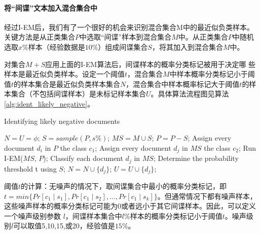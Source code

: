 \paragraph{将“间谍”文本加入混合集合中}

经过I-EM后，我们有了一个很好的机会来识别混合集合M中的最近似负类样本。关键方法是从正类集合$P$中选取“间谍”样本到混合集合$M$中。从正类集合$P$中随机选取$x\%$样本（经验数据是$10\%$）组成间谍集合$S$，将其加入到混合集合$M$中。

对集合$M + S$应用上面的I-EM算法后，间谍样本的概率分类标记被用于决定哪 些样本是最近似负类样本。设定一个阈值$t$，混合集合$M$中样本概率分类标记小于阈值$t$的样本集合是最近似负类样本集合$N$，混合集合中样本概率标记大于阈值$t$的样本集合（不包括间谍样本）是未标记样本集合$U$。具体算法流程图见算法 \ref{alg:ident_likely_negative}。


\begin{algorithm}[htb]
\caption{Identifying likely negative documents}
\label{alg:ident_likely_negative}
\begin{algorithmic}[1]
\STATE $N = U = \phi$;
\STATE $S = sample(P, s\%)$;
\STATE $MS = M \cup S$;
\STATE $P = P - S$;
\STATE Assign every document $d_i$ in $P$ the class $c_1$;
\STATE Assign every document $d_j$ in $MS$ the class $c_2$;
\STATE Run I-EM($MS$, $P$);
\STATE Classify each document $d_j$ in $MS$;
\STATE Determine the probability threshold t using $S$;
\IF {its probability $Pr{c_1 \mid d_j] < t}$ }
\STATE $N = N \cup \{d_j\}$;
\ELSE
\STATE $U = U \cup \{d_j\}$;
\ENDIF
\ENDFOR
\RETURN 
\end{algorithmic}
\end{algorithm}

阈值$t$的计算：无噪声的情况下，取间谍集合中最小的概率分类标记，即$t = min\{Pr[c_1 \mid s_1],Pr[c_1 \mid s_2],\ldots,Pr[c_1 \mid s_k]\}$。但通常情况下都有噪声样本，这些噪声样本的概率分类标记可能为0或者远小于其它间谍样本。因此，可以定义一个噪声级别参数 $l$，间谍样本集合中$l\%$样本的概率分类标记小于阈值$t$。噪声级别$l$可以取值5,10,15,或20，经验值是$15\%$。




